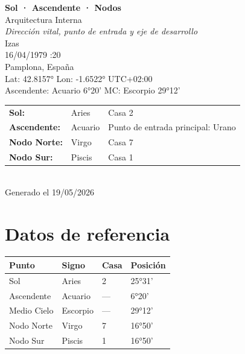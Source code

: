 \documentclass[11pt,a4paper]{article}
\begin{document}
\begin{titlepage}
  \centering
  \vspace*{1.5cm}
  {\Huge\bfseries\color{azulai} Sol · Ascendente · Nodos}\\[0.5cm]
  {\large\color{grisai} Arquitectura Interna}\\[0.3cm]
  {\small\itshape\color{grisai} Dirección vital, punto de entrada y eje de desarrollo}\\[2cm]
  {\huge\color{doradoai} Izas}\\[1.5cm]
  {\Large 16/04/1979 :20}\\[0.3cm]
  {\Large Pamplona, España}\\[0.3cm]
  {\normalsize Lat: 42.8157° \quad Lon: -1.6522° \quad UTC+02:00}\\[0.3cm]
  {\normalsize Ascendente: Acuario 6°20' \quad
    MC: Escorpio 29°12'}\\[2cm]
  \begin{tabular}{lll}
    \textbf{Sol:} & Aries & Casa 2 \\
    \textbf{Ascendente:} & Acuario & Punto de entrada principal: Urano \\
    \textbf{Nodo Norte:} & Virgo & Casa 7 \\
    \textbf{Nodo Sur:}   & Piscis & Casa 1 \\
  \end{tabular}\\[2cm]
  \vfill
  {\small Generado el 19/05/2026}
\end{titlepage}

\tableofcontents
\newpage

\section{Datos de referencia}

\begin{center}
\begin{tabular}{llll}
  \toprule
  \textbf{Punto} & \textbf{Signo} & \textbf{Casa} & \textbf{Posición} \\
  \midrule
  Sol           & Aries & 2 & 25°31' \\
  Ascendente    & Acuario & --- & 6°20' \\
  Medio Cielo   & Escorpio & --- & 29°12' \\
  Nodo Norte    & Virgo & 7 & 16°50' \\
  Nodo Sur      & Piscis & 1 & 16°50' \\
  \bottomrule
\end{tabular}
\end{center}
\end{document}
